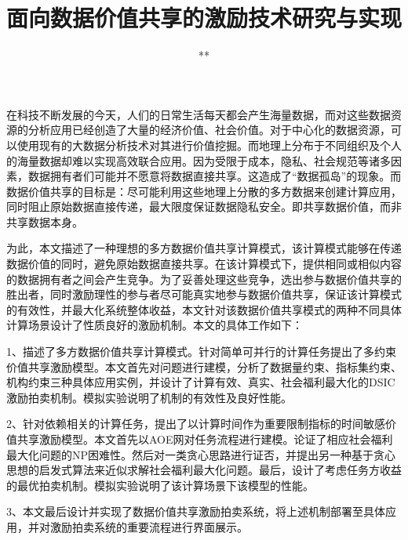 \documentclass[promaster]{thesis-uestc}
\title{面向数据价值共享的激励技术研究与实现}{The Study and Implementation of Incentive Techniques for Value-based Data Sharing}
\author{**}{**}
\begin{document}
\makecover

\originalitydeclaration

\begin{chineseabstract}

在科技不断发展的今天，人们的日常生活每天都会产生海量数据，而对这些数据资源的分析应用已经创造了大量的经济价值、社会价值。对于中心化的数据资源，可以使用现有的大数据分析技术对其进行价值挖掘。而地理上分布于不同组织及个人的海量数据却难以实现高效联合应用。因为受限于成本，隐私、社会规范等诸多因素，数据拥有者们可能并不愿意将数据直接共享。这造成了“数据孤岛”的现象。而数据价值共享的目标是：尽可能利用这些地理上分散的多方数据来创建计算应用，同时阻止原始数据直接传递，最大限度保证数据隐私安全。即共享数据价值，而非共享数据本身。

为此，本文描述了一种理想的多方数据价值共享计算模式，该计算模式能够在传递数据价值的同时，避免原始数据直接共享。在该计算模式下，提供相同或相似内容的数据拥有者之间会产生竞争。为了妥善处理这些竞争，选出参与数据价值共享的胜出者，同时激励理性的参与者尽可能真实地参与数据价值共享，保证该计算模式的有效性，并最大化系统整体收益，本文针对该数据价值共享模式的两种不同具体计算场景设计了性质良好的激励机制。本文的具体工作如下：

1、描述了多方数据价值共享计算模式。针对简单可并行的计算任务提出了多约束价值共享激励模型。本文首先对问题进行建模，分析了数据量约束、指标集约束、机构约束三种具体应用实例，并设计了计算有效、真实、社会福利最大化的DSIC激励拍卖机制。模拟实验说明了机制的有效性及良好性能。

2、针对依赖相关的计算任务，提出了以计算时间作为重要限制指标的时间敏感价值共享激励模型。本文首先以AOE网对任务流程进行建模。论证了相应社会福利最大化问题的NP困难性。然后对一类贪心思路进行证否，并提出另一种基于贪心思想的启发式算法来近似求解社会福利最大化问题。最后，设计了考虑任务方收益的最优拍卖机制。模拟实验说明了该计算场景下该模型的性能。

3、本文最后设计并实现了数据价值共享激励拍卖系统，将上述机制部署至具体应用，并对激励拍卖系统的重要流程进行界面展示。


\end{chineseabstract}
\end{document}
